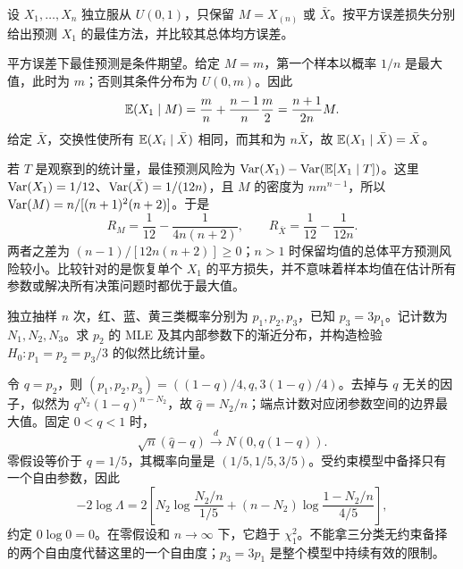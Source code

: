 \begin{example}[原题4：用最大值或均值预测第一个样本]\label{yau:2014-4}
设 $X_1,\ldots,X_n$ 独立服从 $U(0,1)$，只保留 $M=X_{(n)}$ 或 $\bar X$。按平方误差损失分别给出预测 $X_1$ 的最佳方法，并比较其总体均方误差。
\end{example}
\begin{solve}
平方误差下最佳预测是条件期望。给定 $M=m$，第一个样本以概率 $1/n$ 是最大值，此时为 $m$；否则其条件分布为 $U(0,m)$。因此
\[
\mathbb E(X_1\mid M)=\frac mn+\frac{n-1}{n}\frac m2=\frac{n+1}{2n}M.
\]
给定 $\bar X$，交换性使所有 $\mathbb E(X_i\mid\bar X)$ 相同，而其和为 $n\bar X$，故 $\mathbb E(X_1\mid\bar X)=\bar X$。

若 $T$ 是观察到的统计量，最佳预测风险为 $\operatorname{Var}(X_1)-\operatorname{Var}(\mathbb E[X_1\mid T])$。这里 $\operatorname{Var}(X_1)=1/12$、$\operatorname{Var}(\bar X)=1/(12n)$，且 $M$ 的密度为 $nm^{n-1}$，所以 $\operatorname{Var}(M)=n/[(n+1)^2(n+2)]$。于是
\[
R_M=\frac1{12}-\frac1{4n(n+2)},\qquad R_{\bar X}=\frac1{12}-\frac1{12n}.
\]
两者之差为 $(n-1)/[12n(n+2)]\ge0$；$n>1$ 时保留均值的总体平方预测风险较小。比较针对的是恢复单个 $X_1$ 的平方损失，并不意味着样本均值在估计所有参数或解决所有决策问题时都优于最大值。
\end{solve}

\begin{example}[原题5：受约束多项分布中的估计与检验]\label{yau:2014-5}
独立抽样 $n$ 次，红、蓝、黄三类概率分别为 $p_1,p_2,p_3$，已知 $p_3=3p_1$。记计数为 $N_1,N_2,N_3$。求 $p_2$ 的 MLE 及其内部参数下的渐近分布，并构造检验 $H_0:p_1=p_2=p_3/3$ 的似然比统计量。
\end{example}
\begin{solve}
令 $q=p_2$，则 $(p_1,p_2,p_3)=((1-q)/4,q,3(1-q)/4)$。去掉与 $q$ 无关的因子，似然为 $q^{N_2}(1-q)^{n-N_2}$，故 $\widehat q=N_2/n$；端点计数对应闭参数空间的边界最大值。固定 $0<q<1$ 时，
\[
\sqrt n(\widehat q-q)\xrightarrow dN(0,q(1-q)).
\]
零假设等价于 $q=1/5$，其概率向量是 $(1/5,1/5,3/5)$。受约束模型中备择只有一个自由参数，因此
\[
-2\log\Lambda=2\left[N_2\log\frac{N_2/n}{1/5}+(n-N_2)\log\frac{1-N_2/n}{4/5}\right],
\]
约定 $0\log0=0$。在零假设和 $n\to\infty$ 下，它趋于 $\chi^2_1$。不能拿三分类无约束备择的两个自由度代替这里的一个自由度；$p_3=3p_1$ 是整个模型中持续有效的限制。
\end{solve}


